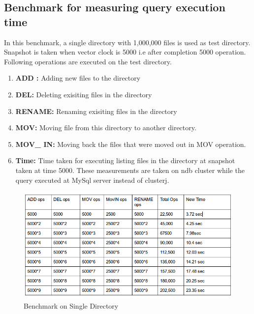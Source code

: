 \subsection{Benchmark for measuring query execution time}
In this benchmark, a single directory with 1,000,000 files is used as test directory. Snapshot is taken when vector clock is 5000 i.e after completion 5000 operation. Following operations are executed on the test directory.
\begin{enumerate}
\item \textbf{ADD :} Adding new files to the directory
\item \textbf{DEL:} Deleting exisiting files in the directory
\item \textbf{RENAME:} Renaming exisiting files in the directory
\item \textbf{MOV:} Moving file from this directory to another directory.
\item \textbf{MOV\_ IN:} Moving back the files that were moved out in MOV operation.
\item \textbf{Time:} Time taken for executing listing files in the directory at snapshot taken at time 5000.
These measurements are taken on ndb cluster while the query executed at MySql server instead of clusterj.
\end{enumerate}
\begin{figure}
\centering  
 \includegraphics[scale=0.8]{figs/preliminar/Benchmark1.png}
  \caption{Benchmark on Single Directory}
  \label{fig:Benchmark1}
\end{figure}
